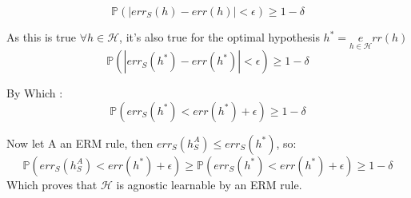 \begin{equation*}
    \mathbb{P}(|err_S(h) - err(h)| < \epsilon) \geq 1-\delta
\end{equation*}

As this is true $\forall h \in \mathcal{H}$, it's also true for the optimal hypothesis $h^* = \underset{h \in \mathcal{H}} err(h)$
\begin{equation*}
    \mathbb{P}(|err_S(h^*) - err(h^*)| < \epsilon) \geq 1-\delta
\end{equation*}

By Which :
\begin{equation*}
    \mathbb{P}(err_S(h^*) < err(h^*) + \epsilon) \geq 1-\delta
\end{equation*}

Now let A an ERM rule, then $err_S(h_S^A) \leq err_S(h^*)$, so:
\begin{equation*}
    \mathbb{P}(err_S(h_S^A) < err(h^*) + \epsilon) \geq \mathbb{P}(err_S(h^*) < err(h^*) + \epsilon) \geq 1-\delta
\end{equation*}
Which proves that $\mathcal{H}$ is agnostic learnable by an ERM rule.
